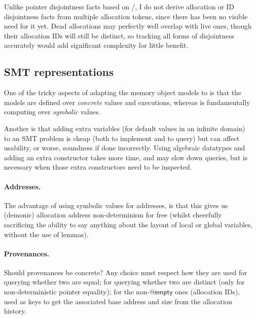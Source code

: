 Unlike pointer disjointness facts based on /, I do
not derive allocation or ID disjointness facts from
multiple allocation tokens, since there has been no visible need for it
yet.\label{sn:ptr-eq-annotation} Dead allocations may perfectly well overlap
with live ones, though their allocation IDs will still be distinct, so tracking
all forms of disjointness accurately would add significant complexity for
little benefit.

\subsection{SMT representations}\label{subsec:smt-rep}

One of the tricky aspects of adapting the memory object models to  is
that the models are defined over \emph{concrete} values and executions, whereas
 is fundamentally computing over \emph{symbolic} values.

Another is that adding extra variables (for default values in an infinite
domain) to an SMT problem is cheap (both to implement and to query) but can
affect usability, or worse, soundness if done incorrectly. Using algebraic
datatypes and adding an extra constructor takes more time, and may slow down
queries, but is necessary when those extra constructors need to be inspected.

\paragraph{Addresses.}%
The advantage of using symbolic values for addresses, is that this gives us
(demonic) allocation address non-determinism for free (whilst cheerfully
sacrificing the ability to say anything about the layout of local or global
variables, without the use of lemmas).

\paragraph{Provenances.}%
Should provenances be concrete? Any choice must respect how they are used  \textemdash{}
for querying whether two are equal; for querying whether two are distinct (only
for non-deterministic pointer equality); for the non-$@\mathsf{empty}$ ones
(allocation IDs), used as keys to get the associated base address and size from
the allocation history.

